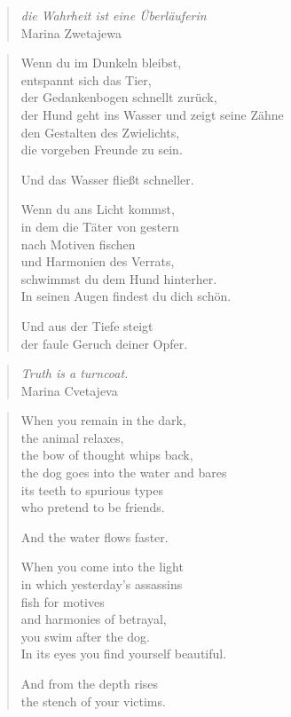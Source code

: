 
\cleartoverso


\begin{quote}
{\itshape die Wahrheit ist eine Überläuferin}\\
\hspace*{2em} Marina Zwetajewa
\end{quote}

\begin{verse}

Wenn du im Dunkeln bleibst,\\
entspannt sich das Tier,\\
der Gedankenbogen schnellt zurück,\\
der Hund geht ins Wasser und zeigt seine Zähne\\
den Gestalten des Zwielichts,\\
die vorgeben Freunde zu sein.

Und das Wasser fließt schneller.

Wenn du ans Licht kommst,\\
in dem die Täter von gestern\\
nach Motiven fischen\\
und Harmonien des Verrats,\\
schwimmst du dem Hund hinterher.\\
In seinen Augen findest du dich schön.

Und aus der Tiefe steigt\\
der faule Geruch deiner Opfer.

\end{verse}

\clearpage


\begin{quote}
{\itshape Truth is a turncoat.}\\
\hspace*{2em} Marina Cvetajeva
\end{quote}

\begin{verse}

When you remain in the dark,\\
the animal relaxes,\\
the bow of thought whips back,\\
the dog goes into the water and bares\\
its teeth to spurious types\\
who pretend to be friends.

And the water flows faster.

When you come into the light\\
in which yesterday's assassins\\
fish for motives\\
and harmonies of betrayal,\\
you swim after the dog.\\
In its eyes you find yourself beautiful.

And from the depth rises\\
the stench of your victims.

\end{verse}
